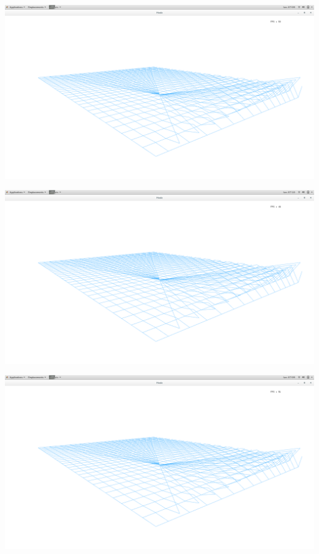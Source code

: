 \documentclass{article}
\begin{document}
\vspace{0.5cm}

\includegraphics[scale=0.2]{./res/3.png}

\vspace{0.5cm}

\includegraphics[scale=0.2]{./res/4.png}

\vspace{0.5cm}

\includegraphics[scale=0.2]{./res/5.png}
\end{document}

